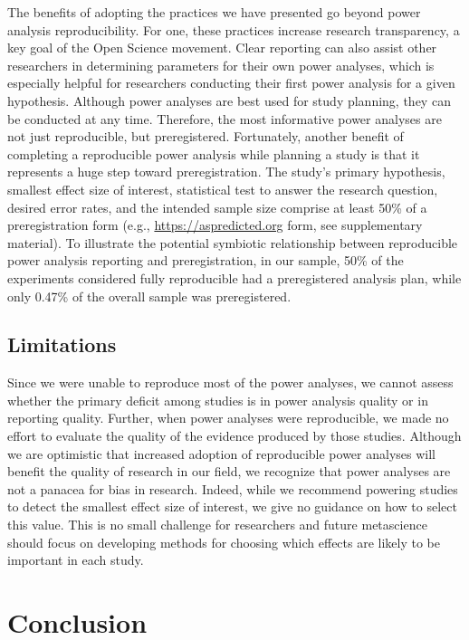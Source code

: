 \documentclass[
  doc, donotrepeattitle,floatsintext]{apa7}
\begin{document}
The benefits of adopting the practices we have presented go beyond power analysis reproducibility. For one, these practices increase research transparency, a key goal of the Open Science movement. Clear reporting can also assist other researchers in determining parameters for their own power analyses, which is especially helpful for researchers conducting their first power analysis for a given hypothesis. Although power analyses are best used for study planning, they can be conducted at any time. Therefore, the most informative power analyses are not just reproducible, but preregistered. Fortunately, another benefit of completing a reproducible power analysis while planning a study is that it represents a huge step toward preregistration. The study's primary hypothesis, smallest effect size of interest, statistical test to answer the research question, desired error rates, and the intended sample size comprise at least 50\% of a preregistration form (e.g., \url{https://aspredicted.org} form, see supplementary material). To illustrate the potential symbiotic relationship between reproducible power analysis reporting and preregistration, in our sample, 50\% of the experiments considered fully reproducible had a preregistered analysis plan, while only 0.47\% of the overall sample was preregistered.

\hypertarget{limitations}{%
\subsection{Limitations}\label{limitations}}

Since we were unable to reproduce most of the power analyses, we cannot assess whether the primary deficit among studies is in power analysis quality or in reporting quality. Further, when power analyses were reproducible, we made no effort to evaluate the quality of the evidence produced by those studies. Although we are optimistic that increased adoption of reproducible power analyses will benefit the quality of research in our field, we recognize that power analyses are not a panacea for bias in research. Indeed, while we recommend powering studies to detect the smallest effect size of interest, we give no guidance on how to select this value. This is no small challenge for researchers and future metascience should focus on developing methods for choosing which effects are likely to be important in each study.

\hypertarget{conclusion}{%
\section{Conclusion}\label{conclusion}}
\end{document}
